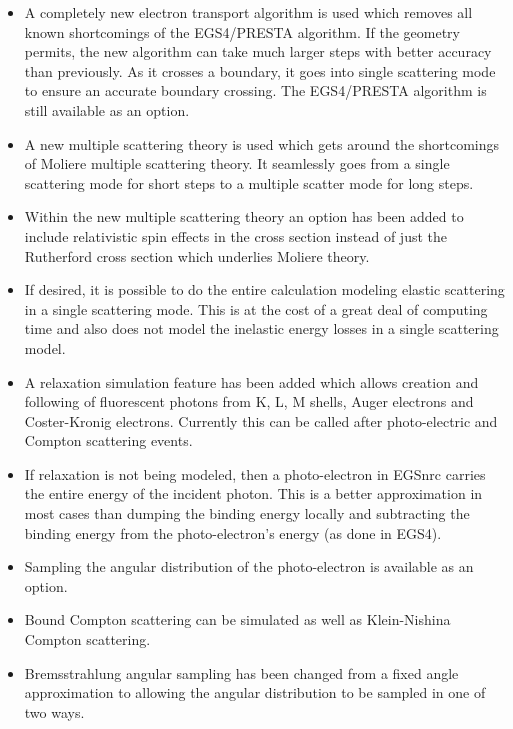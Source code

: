 \begin{itemize}
\item A completely new electron transport algorithm is used which removes
all known shortcomings of the EGS4/PRESTA algorithm.  If the geometry
permits, the new algorithm can take much larger steps with better accuracy
than previously. As it crosses a boundary, it goes into single scattering
mode to ensure an accurate boundary crossing. The EGS4/PRESTA algorithm
is still available as an option.

\item A new multiple scattering theory is used which gets around the
shortcomings of Moliere multiple scattering theory. It seamlessly goes from
a single scattering mode for short steps to a multiple scatter mode for
long steps.

\item Within the new multiple scattering theory an option has been added to
include relativistic spin effects in the cross section instead of just the
Rutherford cross section which underlies Moliere theory.

\item If desired, it is possible to do the entire calculation modeling
elastic scattering in a single scattering mode. This is at the cost of a
great deal of computing time and also does not model the inelastic energy
losses in a single scattering model.

\item A relaxation simulation feature has been added which allows creation
and following of fluorescent photons from K, L, M shells, Auger electrons and
Coster-Kronig electrons. Currently this can be called after photo-electric
and Compton scattering events.

\item If relaxation is not being modeled, then a photo-electron in EGSnrc
carries the entire energy of the incident photon. This is a better
approximation in most cases than dumping the binding energy locally and
subtracting the binding energy from the photo-electron's energy (as done in
EGS4).

\item Sampling the angular distribution of the photo-electron is available
as an option.

\item Bound Compton scattering can be simulated as well as Klein-Nishina
Compton scattering.

\item Bremsstrahlung angular sampling has been changed from a fixed angle
approximation to allowing the angular distribution to be sampled in one of
two ways.


\end{itemize}
